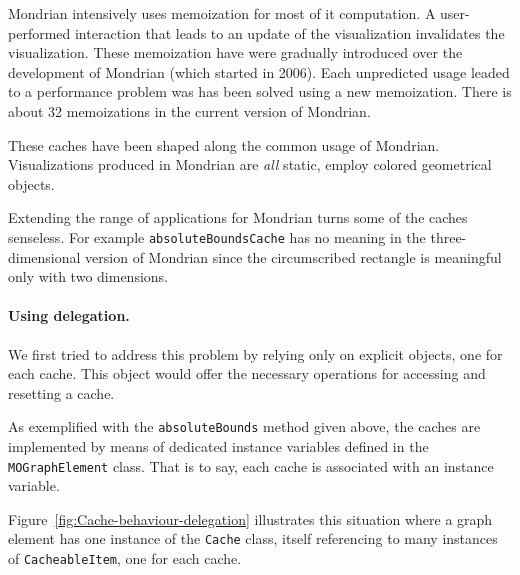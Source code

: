 \documentclass[preprint,10pt]{sigplanconf}
\newcommand{\ct}{\lstinline[backgroundcolor=\color{white},basicstyle=\footnotesize\ttfamily]}
\newcommand{\ab}[1]{\nb{Alexandre}{blue}{#1}}
\newcommand{\sv}[1]{\nb{Santiago}{orange}{#1}}
\newcommand{\figref}[1]{Figure~\ref{fig:#1}\xspace}
\begin{document}
Mondrian intensively uses memoization for most of it computation. A user-performed interaction that leads to an update of the visualization invalidates the visualization. These memoization have were gradually introduced over the development of Mondrian (which started in 2006). Each unpredicted usage leaded to a performance problem was has been solved using a new memoization. There is about 32 memoizations in the current version of Mondrian.

These caches have been shaped along the common usage of Mondrian. Visualizations produced in Mondrian are \emph{all} static, employ colored geometrical objects.

Extending the range of applications for Mondrian turns some of the caches senseless. For example \ct{absoluteBoundsCache} has no meaning in the three-dimensional version of Mondrian since the circumscribed rectangle is meaningful only with two dimensions.

\paragraph{Using delegation.}
We first tried to address this problem by relying only on explicit objects, one for each cache. This object would offer the necessary operations for accessing and resetting a cache.

As exemplified with the \ct{absoluteBounds} method given above, the caches are implemented by means of dedicated instance variables defined in the \ct{MOGraphElement} class. That is to say, each cache is associated with an instance variable.

\figref{Cache-behaviour-delegation} illustrates this situation where a graph element has one instance of the \ct{Cache} class, itself referencing to many instances of \ct{CacheableItem}, one for each cache.
\end{document}
